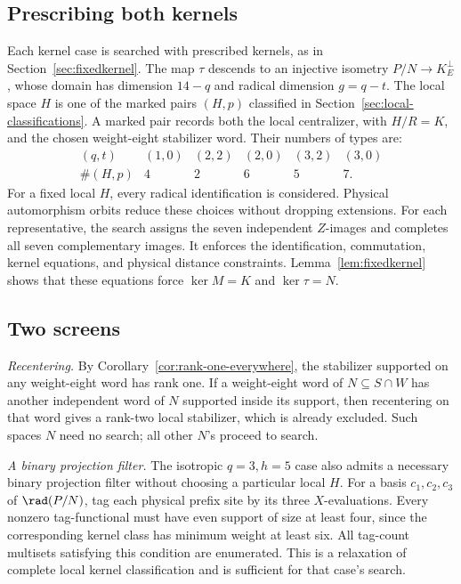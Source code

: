 \subsection{Prescribing both kernels}

Each kernel case is searched with prescribed kernels, as in
Section~\ref{sec:fixedkernel}. The map \(\tau\) descends to an injective
isometry \(P/N\to K^\perp_E\), whose domain has dimension \(14-q\) and
radical dimension \(g=q-t\). The local space \(H\) is one of the marked
pairs \((H,p)\) classified in Section~\ref{sec:local-classifications}.
A marked pair records both the local centralizer, with \(H/R=K\), and
the chosen weight-eight stabilizer word. Their numbers of types are:
\[
 \begin{array}{c|ccccc}
 (q,t)&(1,0)&(2,2)&(2,0)&(3,2)&(3,0)\\\hline
 \#(H,p)&4&2&6&5&7.
 \end{array}
\]
For a fixed local \(H\), every radical identification is considered.
Physical automorphism orbits reduce these choices without dropping
extensions. For each representative, the search assigns the seven
independent \(Z\)-images and completes all seven complementary images.
It enforces the identification, commutation, kernel equations, and
physical distance constraints. Lemma~\ref{lem:fixedkernel} shows that
these equations force \(\ker M=K\) and \(\ker\tau=N\).

\subsection{Two screens}

\emph{Recentering.} By Corollary~\ref{cor:rank-one-everywhere}, the
stabilizer supported on any weight-eight word has rank one. If a
weight-eight word of \(N\subseteq S\cap W\) has another independent
word of \(N\) supported inside its support, then recentering on that
word gives a rank-two local stabilizer, which is already excluded. Such
spaces \(N\) need no search; all other \(N\)'s proceed to search.

\emph{A binary projection filter.} The isotropic \(q=3,h=5\) case also
admits a necessary binary projection filter without choosing a
particular local \(H\). For a basis \(c_1,c_2,c_3\) of
\(\rad(P/N)\), tag each physical prefix site by its three
\(X\)-evaluations. Every nonzero tag-functional must have even support
of size at least four, since the corresponding kernel class has minimum
weight at least six. All tag-count multisets satisfying this condition
are enumerated. This is a relaxation of complete local kernel
classification and is sufficient for that case's search.

